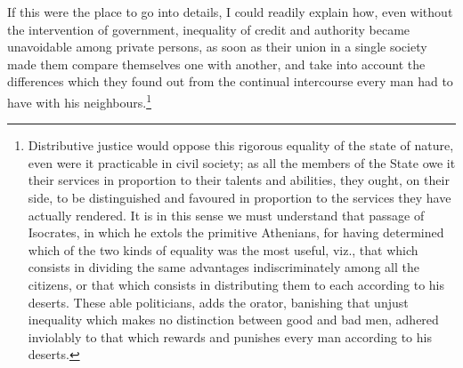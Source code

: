 \documentclass[12pt]{report}
\begin{document}
If this were the place to go into details, I could readily explain how, even without the intervention of government, inequality of credit and authority became unavoidable among private persons, as soon as their union in a single society made them compare themselves one with another, and take into account the differences which they found out from the continual intercourse every man had to have with his neighbours.\footnote{Distributive justice would oppose this rigorous equality of the state of nature, even were it practicable in civil society; as all the members of the State owe it their services in proportion to their talents and abilities, they ought, on their side, to be distinguished and favoured in proportion to the services they have actually rendered. It is in this sense we must understand that passage of Isocrates, in which he extols the primitive Athenians, for having determined which of the two kinds of equality was the most useful, viz., that which consists in dividing the same advantages indiscriminately among all the citizens, or that which consists in distributing them to each according to his deserts. These able politicians, adds the orator, banishing that unjust inequality which makes no distinction between good and bad men, adhered inviolably to that which rewards and punishes every man according to his deserts.

}
\end{document}
